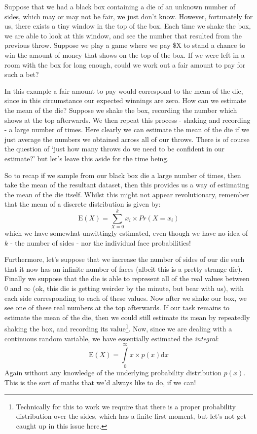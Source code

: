 \documentclass[11pt,fullpage]{book}
\begin{document}
Suppose that we had a black box containing a die of an unknown number of sides, which may or may not be fair, we just don't know. However, fortunately for us, there exists a tiny window in the top of the box. Each time we shake the box, we are able to look at this window, and see the number that resulted from the previous throw. Suppose we play a game where we pay \$X to stand a chance to win the amount of money that shows on the top of the box. If we were left in a room with the box for long enough, could we work out a fair amount to pay for such a bet?

In this example a fair amount to pay would correspond to the mean of the die, since in this circumstance our expected winnings are zero. How can we estimate the mean of the die? Suppose we shake the box, recording the number which shows at the top afterwards. We then repeat this process - shaking and recording - a large number of times. Here clearly we can estimate the mean of the die if we just average the numbers we obtained across all of our throws. There is of course the question of `just how many throws do we need to be confident in our estimate?' but let's leave this aside for the time being. 

So to recap if we sample from our black box die a large number of times, then take the mean of the resultant dataset, then this provides us a way of estimating the mean of the die itself. Whilst this might not appear revolutionary, remember that the mean of a discrete distribution is given by:
%
\begin{equation}
\mathrm{E}(X) = \sum\limits_{X=0}^{k} x_i \times Pr(X=x_i)
\end{equation}
%
which we have somewhat-unwittingly estimated, even though we have no idea of $k$ - the number of sides - nor the individual face probabilities!

Furthermore, let's suppose that we increase the number of sides of our die such that it now has an infinite number of faces (albeit this is a pretty strange die). Finally we suppose that the die is able to represent all of the real values between 0 and $\infty$ (ok, this die is getting weirder by the minute, but bear with us), with each side corresponding to each of these values. Now after we shake our box, we see one of these real numbers at the top afterwards. If our task remains to estimate the mean of the die, then we could still estimate its mean by repeatedly shaking the box, and recording its value\footnote{Technically for this to work we require that there is a proper probability distribution over the sides, which has a finite first moment, but let's not get caught up in this issue here.}. Now, since we are dealing with a continuous random variable, we have essentially estimated the \textit{integral}:
%
\begin{equation}
\mathrm{E}(X) = \int\limits_{0}^{\infty} x \times p(x)\mathrm{d}x
\end{equation}
%
Again without any knowledge of the underlying probability distribution $p(x)$. This is the sort of maths that we'd always like to do, if we can!
\end{document}
